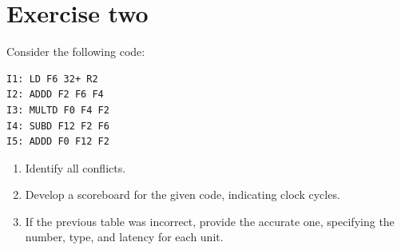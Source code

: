 \section{Exercise two}

Consider the following code:
\begin{verbatim}
I1: LD F6 32+ R2
I2: ADDD F2 F6 F4
I3: MULTD F0 F4 F2
I4: SUBD F12 F2 F6
I5: ADDD F0 F12 F2
\end{verbatim}
\begin{enumerate}
    \item Identify all conflicts.
    \item Develop a scoreboard for the given code, indicating clock cycles.
    \item If the previous table was incorrect, provide the accurate one, specifying the number, type, and latency for each unit.
\end{enumerate}

